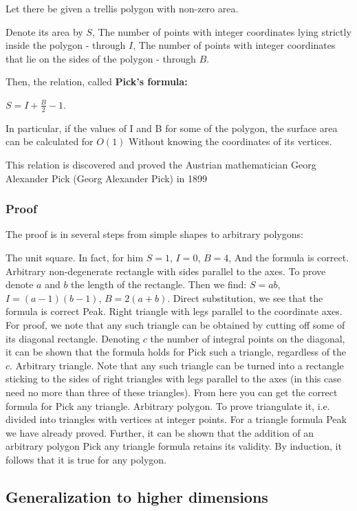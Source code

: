 Let there be given a trellis polygon with non-zero area.

Denote its area by $S$, The number of points with integer coordinates lying strictly inside the polygon - through $I$, The number of points with integer coordinates that lie on the sides of the polygon - through $B$.

Then, the relation, called \textbf{Pick's formula:}

$S = I + \frac {B} {2} - 1.$

In particular, if the values ​​of I and B for some of the polygon, the surface area can be calculated for $O (1)$ Without knowing the coordinates of its vertices.

This relation is discovered and proved the Austrian mathematician Georg Alexander Pick (Georg Alexander Pick) in 1899

\subsubsection{ Proof }

The proof is in several steps from simple shapes to arbitrary polygons:

The unit square. In fact, for him $S = 1$, $I = 0$, $B = 4$, And the formula is correct.
Arbitrary non-degenerate rectangle with sides parallel to the axes. To prove denote $a$ and $b$ the length of the rectangle. Then we find: $S = ab$, $I = (a-1) (b-1)$, $B = 2 (a + b)$. Direct substitution, we see that the formula is correct Peak.
Right triangle with legs parallel to the coordinate axes. For proof, we note that any such triangle can be obtained by cutting off some of its diagonal rectangle. Denoting $c$ the number of integral points on the diagonal, it can be shown that the formula holds for Pick such a triangle, regardless of the $c$.
Arbitrary triangle. Note that any such triangle can be turned into a rectangle sticking to the sides of right triangles with legs parallel to the axes (in this case need no more than three of these triangles). From here you can get the correct formula for Pick any triangle.
Arbitrary polygon. To prove triangulate it, i.e. divided into triangles with vertices at integer points. For a triangle formula Peak we have already proved. Further, it can be shown that the addition of an arbitrary polygon Pick any triangle formula retains its validity. By induction, it follows that it is true for any polygon.
\subsection{ Generalization to higher dimensions }

